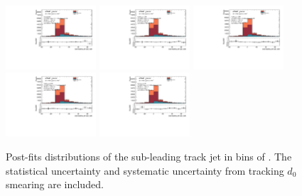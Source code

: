 \begin{figure}[htbp]
  \centering
 \includegraphics[width=0.3\textwidth]{figures/gbb/Sub_Sd0_Fits/Canv_Fit_0-Deltatheta-0628_coarse_y.pdf}
 \includegraphics[width=0.3\textwidth]{figures/gbb/Sub_Sd0_Fits/Canv_Fit_0628-Deltatheta-1256_coarse_y.pdf}
 \includegraphics[width=0.3\textwidth]{figures/gbb/Sub_Sd0_Fits/Canv_Fit_1256-Deltatheta-1884_coarse_y.pdf}\\
 \includegraphics[width=0.3\textwidth]{figures/gbb/Sub_Sd0_Fits/Canv_Fit_1884-Deltatheta-2512_coarse_y.pdf}
 \includegraphics[width=0.3\textwidth]{figures/gbb/Sub_Sd0_Fits/Canv_Fit_2512-Deltatheta-3140_coarse_y.pdf}

\caption{Post-fits \subsdzero distributions of the sub-leading track jet in bins of \dphi. The statistical uncertainty and systematic uncertainty from tracking $d_0$ smearing are included.}
  \label{fig:dphi-postfits-subleading-sub}
\end{figure}
